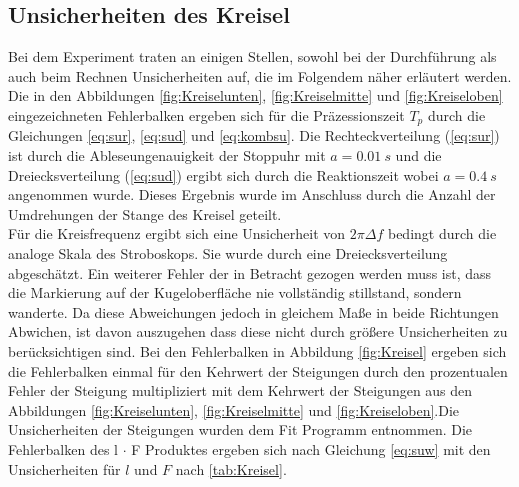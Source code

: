 \subsection{Unsicherheiten des Kreisel}
Bei dem Experiment traten an einigen Stellen, sowohl bei der Durchführung als auch beim Rechnen Unsicherheiten auf, die im Folgendem näher erläutert werden.
Die in den Abbildungen \ref{fig:Kreiselunten}, \ref{fig:Kreiselmitte} und \ref{fig:Kreiseloben} eingezeichneten Fehlerbalken ergeben sich für die Präzessionszeit $T_p$ durch die Gleichungen \ref{eq:sur}, \ref{eq:sud} und \ref{eq:kombsu}.
Die Rechteckverteilung (\ref{eq:sur}) ist durch die Ableseungenauigkeit der Stoppuhr mit $a=\SI{0.01}{s}$ und die Dreiecksverteilung (\ref{eq:sud}) ergibt sich durch die Reaktionszeit wobei $a=\SI{0,4}{s}$ angenommen wurde. Dieses Ergebnis wurde im Anschluss durch die Anzahl der Umdrehungen der Stange des Kreisel geteilt.\\

Für die Kreisfrequenz ergibt sich eine Unsicherheit von $2 \pi \Delta f$ bedingt durch die analoge Skala des Stroboskops. Sie wurde durch eine Dreiecksverteilung abgeschätzt. %
Ein weiterer Fehler der in Betracht gezogen werden muss ist, dass die Markierung auf der Kugeloberfläche nie vollständig stillstand, sondern wanderte. Da diese Abweichungen jedoch in gleichem Maße in beide Richtungen Abwichen, ist davon auszugehen dass diese nicht durch größere Unsicherheiten zu berücksichtigen sind.
Bei den Fehlerbalken in Abbildung \ref{fig:Kreisel} ergeben sich die Fehlerbalken einmal für den Kehrwert der Steigungen durch den prozentualen Fehler der Steigung multipliziert mit dem Kehrwert der Steigungen aus den Abbildungen \ref{fig:Kreiselunten}, \ref{fig:Kreiselmitte} und \ref{fig:Kreiseloben}.Die Unsicherheiten der Steigungen wurden dem Fit Programm entnommen. 
Die Fehlerbalken des  l $\cdot$ F Produktes ergeben sich nach Gleichung \ref{eq:suw} mit den Unsicherheiten für $l$ und $F$ nach \cref{tab:Kreisel}.\\

